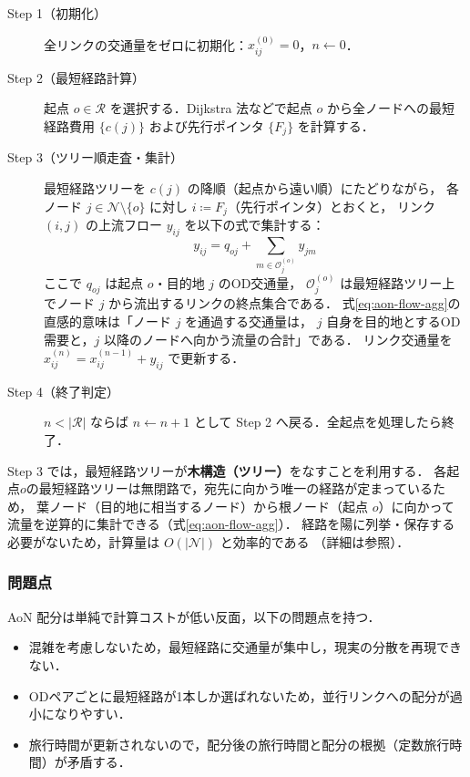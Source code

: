 \begin{description}
  \item[\textsf{Step 1}（初期化）]
    全リンクの交通量をゼロに初期化：$x_{ij}^{(0)} = 0$，$n \leftarrow 0$．

  \item[\textsf{Step 2}（最短経路計算）]
    起点 $o \in \mathcal{R}$ を選択する．Dijkstra 法などで起点 $o$ から全ノードへの最短経路費用
    $\{c(j)\}$ および先行ポインタ $\{F_j\}$ を計算する．

  \item[\textsf{Step 3}（ツリー順走査・集計）]
    最短経路ツリーを $c(j)$ の降順（起点から遠い順）にたどりながら，
    各ノード $j \in \mathcal{N} \setminus \{o\}$ に対し $i \coloneqq F_j$（先行ポインタ）とおくと，
    リンク $(i,j)$ の上流フロー $y_{ij}$ を以下の式で集計する：
    \begin{equation}
      y_{ij} = q_{oj} + \sum_{m \in \mathcal{O}_j^{(o)}} y_{jm}
      \label{eq:aon-flow-agg}
    \end{equation}
    ここで $q_{oj}$ は起点 $o$・目的地 $j$ のOD交通量，
    $\mathcal{O}_j^{(o)}$ は最短経路ツリー上でノード $j$ から流出するリンクの終点集合である．
    式\eqref{eq:aon-flow-agg}の直感的意味は「ノード $j$ を通過する交通量は，
    $j$ 自身を目的地とするOD需要と，$j$ 以降のノードへ向かう流量の合計」である．
    リンク交通量を $x_{ij}^{(n)} = x_{ij}^{(n-1)} + y_{ij}$ で更新する．

  \item[\textsf{Step 4}（終了判定）]
    $n < |\mathcal{R}|$ ならば $n \leftarrow n+1$ として Step 2 へ戻る．全起点を処理したら終了．
\end{description}

Step 3 では，最短経路ツリーが\textbf{木構造（ツリー）}をなすことを利用する．
各起点$o$の最短経路ツリーは無閉路で，宛先に向かう唯一の経路が定まっているため，
葉ノード（目的地に相当するノード）から根ノード（起点 $o$）に向かって
流量を逆算的に集計できる（式\eqref{eq:aon-flow-agg}）．
経路を陽に列挙・保存する必要がないため，計算量は $O(|\mathcal{N}|)$ と効率的である
（詳細は参照）．

\subsubsection*{問題点}

AoN 配分は単純で計算コストが低い反面，以下の問題点を持つ．

\begin{itemize}
  \item 混雑を考慮しないため，最短経路に交通量が集中し，現実の分散を再現できない．
  \item ODペアごとに最短経路が1本しか選ばれないため，並行リンクへの配分が過小になりやすい．
  \item 旅行時間が更新されないので，配分後の旅行時間と配分の根拠（定数旅行時間）が矛盾する．
\end{itemize}

